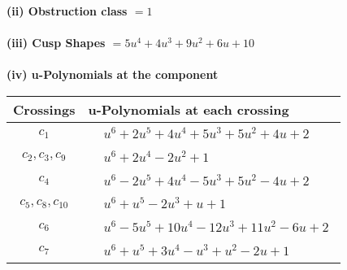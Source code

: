 \documentclass[1p]{elsarticle_modified}
\theoremstyle{definition}
\begin{document}
\flushleft \textbf{(ii) Obstruction class $= 1$}\\~\\
\flushleft \textbf{(iii) Cusp Shapes $= 5 u^4+4 u^3+9 u^2+6 u+10$}\\~\\
\newpage\renewcommand{\arraystretch}{1}
\flushleft \textbf{(iv) u-Polynomials at the component}\newline \\
\begin{tabular}{m{50pt}|m{274pt}}
Crossings & \hspace{64pt}u-Polynomials at each crossing \\
\hline $$\begin{aligned}c_{1}\end{aligned}$$&$\begin{aligned}
&u^6+2 u^5+4 u^4+5 u^3+5 u^2+4 u+2
\end{aligned}$\\
\hline $$\begin{aligned}c_{2},c_{3},c_{9}\end{aligned}$$&$\begin{aligned}
&u^6+2 u^4-2 u^2+1
\end{aligned}$\\
\hline $$\begin{aligned}c_{4}\end{aligned}$$&$\begin{aligned}
&u^6-2 u^5+4 u^4-5 u^3+5 u^2-4 u+2
\end{aligned}$\\
\hline $$\begin{aligned}c_{5},c_{8},c_{10}\end{aligned}$$&$\begin{aligned}
&u^6+u^5-2 u^3+u+1
\end{aligned}$\\
\hline $$\begin{aligned}c_{6}\end{aligned}$$&$\begin{aligned}
&u^6-5 u^5+10 u^4-12 u^3+11 u^2-6 u+2
\end{aligned}$\\
\hline $$\begin{aligned}c_{7}\end{aligned}$$&$\begin{aligned}
&u^6+u^5+3 u^4- u^3+u^2-2 u+1
\end{aligned}$\\
\hline
\end{tabular}\\~\\
\end{document}
